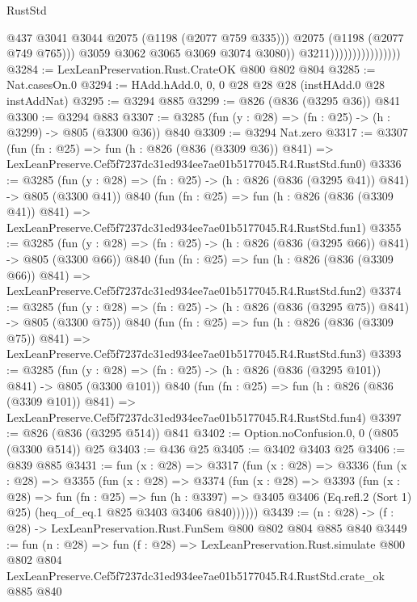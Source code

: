 \begin{lexlean}{RustStd}
\begin{coremodule}
                                            @437
                                            @3041
                                            @3044
                                            @2075
                                            (@1198 (@2077 @759 @335)))
                                          @2075
                                          (@1198 (@2077 @749 @765)))
                                        @3059
                                        @3062
                                        @3065
                                        @3069
                                        @3074
                                        @3080))
                                    @3211))))))))))))))))
@3284 := LexLeanPreservation.Rust.CrateOK @800 @802 @804
@3285 := Nat.casesOn.{0}
@3294 := HAdd.hAdd.{0, 0, 0} @28 @28 @28 (instHAdd.{0} @28 instAddNat)
@3295 := @3294 @885
@3299 := @826 (@836 (@3295 @36)) @841
@3300 := @3294 @883
@3307 := @3285 (fun (y : @28) => (fn : @25) -> (h : @3299) -> @805 (@3300 @36)) @840
@3309 := @3294 Nat.zero
@3317 := @3307
    (fun (fn : @25) =>
    fun (h : @826 (@836 (@3309 @36)) @841) =>
    LexLeanPreserve.Cef5f7237dc31ed934ee7ae01b5177045.R4.RustStd.fun0)
@3336 := @3285
    (fun (y : @28) => (fn : @25) -> (h : @826 (@836 (@3295 @41)) @841) -> @805 (@3300 @41))
    @840
    (fun (fn : @25) =>
    fun (h : @826 (@836 (@3309 @41)) @841) =>
    LexLeanPreserve.Cef5f7237dc31ed934ee7ae01b5177045.R4.RustStd.fun1)
@3355 := @3285
    (fun (y : @28) => (fn : @25) -> (h : @826 (@836 (@3295 @66)) @841) -> @805 (@3300 @66))
    @840
    (fun (fn : @25) =>
    fun (h : @826 (@836 (@3309 @66)) @841) =>
    LexLeanPreserve.Cef5f7237dc31ed934ee7ae01b5177045.R4.RustStd.fun2)
@3374 := @3285
    (fun (y : @28) => (fn : @25) -> (h : @826 (@836 (@3295 @75)) @841) -> @805 (@3300 @75))
    @840
    (fun (fn : @25) =>
    fun (h : @826 (@836 (@3309 @75)) @841) =>
    LexLeanPreserve.Cef5f7237dc31ed934ee7ae01b5177045.R4.RustStd.fun3)
@3393 := @3285
    (fun (y : @28) => (fn : @25) -> (h : @826 (@836 (@3295 @101)) @841) -> @805 (@3300 @101))
    @840
    (fun (fn : @25) =>
    fun (h : @826 (@836 (@3309 @101)) @841) =>
    LexLeanPreserve.Cef5f7237dc31ed934ee7ae01b5177045.R4.RustStd.fun4)
@3397 := @826 (@836 (@3295 @514)) @841
@3402 := Option.noConfusion.{0, 0} (@805 (@3300 @514)) @25
@3403 := @436 @25
@3405 := @3402 @3403 @25
@3406 := @839 @885
@3431 := fun (x : @28) =>
  @3317
    (fun (x : @28) =>
    @3336
      (fun (x : @28) =>
      @3355
        (fun (x : @28) =>
        @3374
          (fun (x : @28) =>
          @3393
            (fun (x : @28) =>
            fun (fn : @25) =>
            fun (h : @3397) =>
            @3405 @3406 (Eq.refl.{2} (Sort 1) @25) (heq_of_eq.{1} @825 @3403 @3406 @840))))))
@3439 := (n : @28) -> (f : @28) -> LexLeanPreservation.Rust.FunSem @800 @802 @804 @885 @840
@3449 := fun (n : @28) =>
  fun (f : @28) =>
  LexLeanPreservation.Rust.simulate
    @800
    @802
    @804
    LexLeanPreserve.Cef5f7237dc31ed934ee7ae01b5177045.R4.RustStd.crate_ok
    @885
    @840
\end{coremodule}
\end{lexlean}
